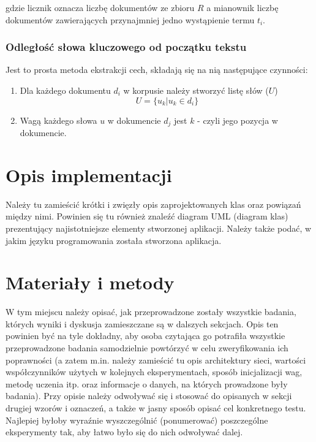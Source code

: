 \documentclass{classrep}
\begin{document}
gdzie licznik oznacza liczbę dokumentów ze zbioru $ R $ a mianownik liczbę dokumentów
zawierających przynajmniej jedno wystąpienie termu $ t_{i} $.

\subsubsection{Odległość słowa kluczowego od początku tekstu}
Jest to prosta metoda ekstrakcji cech, składają się na nią następujące czynności:

\begin{enumerate}
  \item Dla każdego dokumentu $ d_{i} $ w korpusie należy stworzyć listę słów ($ U $)
    $$ U = \{ u_{k} | u_{k} \in d_{i} \} $$
  \item Wagą każdego słowa $ u $ w dokumencie $ d_{j} $ jest $ k $ - czyli jego pozycja w
    dokumencie.
\end{enumerate}

\section{Opis implementacji}
{\color{blue}
Należy tu zamieścić krótki i zwięzły opis zaprojektowanych klas oraz powiązań
między nimi. Powinien się tu również znaleźć diagram UML  (diagram klas)
prezentujący najistotniejsze elementy stworzonej aplikacji. Należy także
podać, w jakim języku programowania została stworzona aplikacja. }

\section{Materiały i metody}
{\color{blue}
W tym miejscu należy opisać, jak przeprowadzone zostały wszystkie badania,
których wyniki i dyskusja zamieszczane są w dalszych sekcjach. Opis ten
powinien być na tyle dokładny, aby osoba czytająca go potrafiła wszystkie
przeprowadzone badania samodzielnie powtórzyć w celu zweryfikowania ich
poprawności (a zatem m.in. należy zamieścić tu opis architektury sieci,
wartości współczynników użytych w kolejnych eksperymentach, sposób
inicjalizacji wag, metodę uczenia itp. oraz informacje o danych, na których
prowadzone były badania). Przy opisie należy odwoływać się i stosować do
opisanych w sekcji drugiej wzorów i oznaczeń, a także w jasny sposób opisać
cel konkretnego testu. Najlepiej byłoby wyraźnie wyszczególnić (ponumerować)
poszczególne eksperymenty tak, aby łatwo było się do nich odwoływać dalej.}
\end{document}
